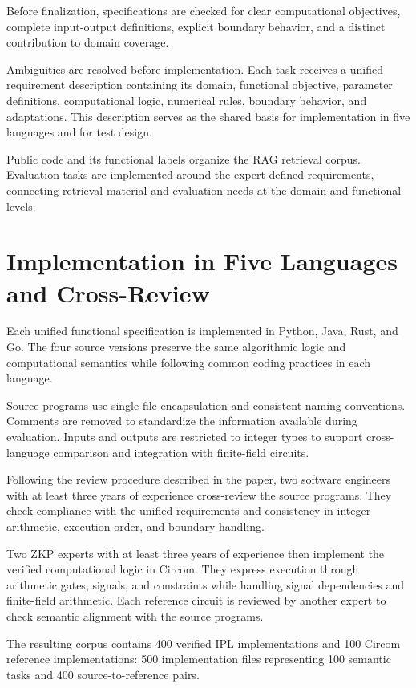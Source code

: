 \documentclass[11pt,a4paper]{article}
\begin{document}
Before finalization, specifications are checked for clear computational objectives, complete input-output definitions, explicit boundary behavior, and a distinct contribution to domain coverage.

Ambiguities are resolved before implementation. Each task receives a unified requirement description containing its domain, functional objective, parameter definitions, computational logic, numerical rules, boundary behavior, and adaptations. This description serves as the shared basis for implementation in five languages and for test design.

Public code and its functional labels organize the RAG retrieval corpus. Evaluation tasks are implemented around the expert-defined requirements, connecting retrieval material and evaluation needs at the domain and functional levels.

\section{Implementation in Five Languages and Cross-Review}

Each unified functional specification is implemented in Python, Java, Rust, and Go. The four source versions preserve the same algorithmic logic and computational semantics while following common coding practices in each language.

Source programs use single-file encapsulation and consistent naming conventions. Comments are removed to standardize the information available during evaluation. Inputs and outputs are restricted to integer types to support cross-language comparison and integration with finite-field circuits.

Following the review procedure described in the paper, two software engineers with at least three years of experience cross-review the source programs. They check compliance with the unified requirements and consistency in integer arithmetic, execution order, and boundary handling.

Two ZKP experts with at least three years of experience then implement the verified computational logic in Circom. They express execution through arithmetic gates, signals, and constraints while handling signal dependencies and finite-field arithmetic. Each reference circuit is reviewed by another expert to check semantic alignment with the source programs.

The resulting corpus contains 400 verified IPL implementations and 100 Circom reference implementations: 500 implementation files representing 100 semantic tasks and 400 source-to-reference pairs.
\end{document}
